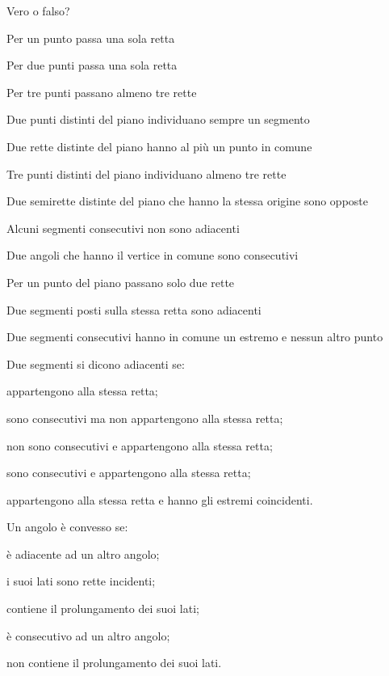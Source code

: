\begin{esercizio}
Vero o falso?
\begin{enumeratea}
\item Per un punto passa una sola retta		\hfill\boxV\quad\boxF
\item Per due punti passa una sola retta		
\hfill\boxV\quad\boxF
\item Per tre punti passano almeno tre rette	\hfill\boxV\quad\boxF
\item Due punti distinti del piano individuano sempre un 
segmento	\hfill\boxV\quad\boxF
\item Due rette distinte del piano hanno al più un punto in 
comune	\hfill\boxV\quad\boxF
\item Tre punti distinti del piano individuano almeno tre rette	
\hfill\boxV\quad\boxF
\item Due semirette distinte del piano che hanno la stessa origine 
sono opposte	\hfill\boxV\quad\boxF
\item Alcuni segmenti consecutivi non sono adiacenti		
\hfill\boxV\quad\boxF
\item Due angoli che hanno il vertice in comune sono 
consecutivi		\hfill\boxV\quad\boxF
\item Per un punto del piano passano solo due rette		
\hfill\boxV\quad\boxF
\item Due segmenti posti sulla stessa retta sono adiacenti	
\hfill\boxV\quad\boxF
\item Due segmenti consecutivi hanno in comune un estremo e nessun 
altro punto		\hfill\boxV\quad\boxF
\end{enumeratea}
\end{esercizio}

\begin{esercizio}
Due segmenti si dicono adiacenti se:
\begin{enumeratea}
\item appartengono alla stessa retta;
\item sono consecutivi ma non appartengono alla stessa retta;
\item non sono consecutivi e appartengono alla stessa retta;
\item sono consecutivi e appartengono alla stessa retta;
\item appartengono alla stessa retta e hanno gli estremi coincidenti.
\end{enumeratea}
\end{esercizio}

\begin{esercizio}
Un angolo è convesso se:
\begin{enumeratea}
\item è adiacente ad un altro angolo;
\item i suoi lati sono rette incidenti;
\item contiene il prolungamento dei suoi lati;
\item è consecutivo ad un altro angolo;
\item non contiene il prolungamento dei suoi lati.
\end{enumeratea}
\end{esercizio}

